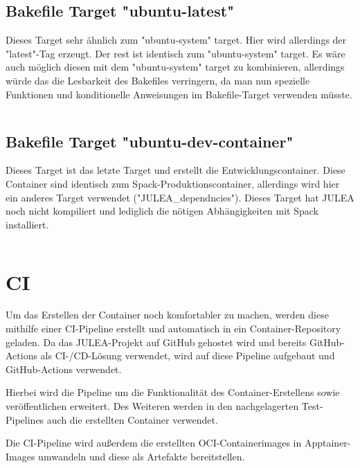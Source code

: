 \subsection{Bakefile Target "ubuntu-latest"}

Dieses Target sehr ähnlich zum "ubuntu-system" target. Hier wird allerdings der "latest"-Tag erzeugt. 
Der rest ist identisch zum "ubuntu-system" target. Es wäre auch möglich diesen mit dem "ubuntu-system" target zu kombinieren, allerdings würde das die Lesbarkeit des Bakefiles verringern, da man nun spezielle Funktionen und konditionelle Anweisungen im Bakefile-Target verwenden müsste.

\inputminted[firstline=52,lastline=62]{./lexers/docker-bake-lexer.py}{./code-examples/docker-bake.hcl}

\subsection{Bakefile Target "ubuntu-dev-container"}

Dieses Target ist das letzte Target und erstellt die Entwicklungscontainer. Diese Container sind identisch zum Spack-Produktionscontainer, allerdings wird hier ein anderes Target verwendet ("JULEA\_dependncies"). Dieses Target hat JULEA noch nicht kompiliert und lediglich die nötigen Abhängigkeiten mit Spack installiert.

\inputminted[firstline=64]{./lexers/docker-bake-lexer.py}{./code-examples/docker-bake.hcl}

\section{CI}

Um das Erstellen der Container noch komfortabler zu machen, werden diese mithilfe einer CI-Pipeline erstellt und automatisch in ein Container-Repository geladen. Da das JULEA-Projekt auf GitHub gehostet wird und bereits GitHub-Actions als CI-/CD-Lösung verwendet, wird auf diese Pipeline aufgebaut und GitHub-Actions verwendet.

Hierbei wird die Pipeline um die Funktionalität des Container-Erstellens sowie veröffentlichen erweitert. Des Weiteren werden in den nachgelagerten Test-Pipelines auch die erstellten Container verwendet.

Die CI-Pipeline wird außerdem die erstellten OCI-Containerimages in Apptainer-Images umwandeln und diese als Artefakte bereitstellen.


